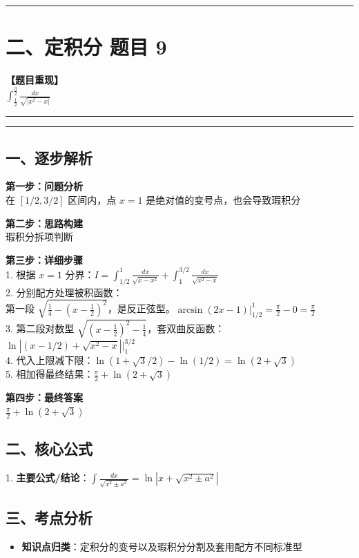 ﻿\documentclass[12pt, a4paper]{ctexart}
\newcommand{\TopSeparator}{
    \par\noindent\rule{\textwidth}{1.5pt}\vspace{0.5em}
}
\newcommand{\AnalysisSeparator}{
    \par\noindent\rule{\textwidth}{0.5pt}\vspace{0.2em}\hrule\vspace{0.5em}
}
\newenvironment{RedAnalysis}{
    \par
    \color{red} 
}{
    \par
    \color{black} 
}
\begin{document}
\vspace{2em}

\TopSeparator
\section*{二、定积分 题目 9}

\textbf{【题目重现】} \\
$\int_{\frac{1}{2}}^{\frac{3}{2}} \frac{dx}{\sqrt{|x^2-x|}}$

\AnalysisSeparator

\begin{RedAnalysis}

	\subsection*{一、逐步解析}

	\textbf{第一步：问题分析} \\
	在 $[1/2, 3/2]$ 区间内，点 $x=1$ 是绝对值的变号点，也会导致瑕积分

	\textbf{第二步：思路构建} \\
	瑕积分拆项判断

	\textbf{第三步：详细步骤} \\
	1. 根据 $x=1$ 分界：$I = \int_{1/2}^1 \frac{dx}{\sqrt{x-x^2}} + \int_1^{3/2} \frac{dx}{\sqrt{x^2-x}}$ \\ 
	2. 分别配方处理被积函数：\\ 
	第一段 $\sqrt{\frac{1}{4} - (x-\frac{1}{2})^2}$，是反正弦型。$\arcsin(2x-1) | _{1/2}^1 = \frac{\pi}{2} - 0 = \frac{\pi}{2}$ \\ 
	3. 第二段对数型 $\sqrt{(x-\frac{1}{2})^2 - \frac{1}{4}}$，套双曲反函数：$\ln| (x-1/2) + \sqrt{x^2-x} | \Big|_1^{3/2}$ \\ 
	4. 代入上限减下限：$\ln(1 + \sqrt{3}/2) - \ln(1/2) = \ln(2+\sqrt{3})$ \\ 
	5. 相加得最终结果：$\frac{\pi}{2} + \ln(2+\sqrt{3})$

	\textbf{第四步：最终答案} \\
	$\frac{\pi}{2} + \ln(2+\sqrt{3})$

	\subsection*{二、核心公式}
	1. \textbf{主要公式/结论}：$\int \frac{dx}{\sqrt{x^2 \pm a^2}} = \ln|x + \sqrt{x^2 \pm a^2}|$

	\subsection*{三、考点分析}
	\begin{itemize}
		\item \textbf{知识点归类}：定积分的变号以及瑕积分分割及套用配方不同标准型
	\end{itemize}

\end{RedAnalysis}
\end{document}
